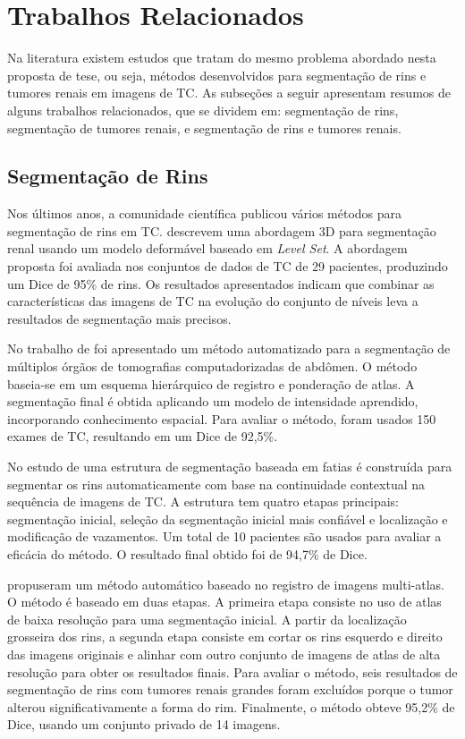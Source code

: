 \chapter{Trabalhos Relacionados}
\label{cap:trabalhos-relacionados}
\phantom{0}

Na literatura existem estudos que tratam do mesmo problema abordado nesta proposta de tese, ou seja, métodos desenvolvidos para segmentação de rins e tumores renais em imagens de TC. As subseções a seguir apresentam resumos de alguns trabalhos relacionados, que se dividem em: segmentação de rins, segmentação de tumores renais, e segmentação de rins e tumores renais.

\section{Segmentação de Rins}
\label{sec:trabalhos-relacionados-rins}

Nos últimos anos, a comunidade científica publicou vários métodos para segmentação de rins em TC.  descrevem uma abordagem 3D para segmentação renal usando um modelo deformável baseado em \textit{Level Set}. A abordagem proposta foi avaliada nos conjuntos de dados de TC de 29 pacientes, produzindo um Dice de 95\% de rins. Os resultados apresentados indicam que combinar as características das imagens de TC na evolução do conjunto de níveis leva a resultados de segmentação mais precisos.

No trabalho de  foi apresentado um método automatizado para a segmentação de múltiplos órgãos de tomografias computadorizadas de abdômen. O método baseia-se em um esquema hierárquico de registro e ponderação de atlas. A segmentação final é obtida aplicando um modelo de intensidade aprendido, incorporando conhecimento espacial. Para avaliar o método, foram usados 150 exames de TC, resultando em um Dice de 92,5\%.

No estudo de  uma estrutura de segmentação baseada em fatias é construída para segmentar os rins automaticamente com base na continuidade contextual na sequência de imagens de TC. A estrutura tem quatro etapas principais: segmentação inicial, seleção da segmentação inicial mais confiável e localização e modificação de vazamentos. Um total de 10 pacientes são usados para avaliar a eficácia do método. O resultado final obtido foi de 94,7\% de Dice.

 propuseram um método automático baseado no registro de imagens multi-atlas. O método é baseado em duas etapas. A primeira etapa consiste no uso de atlas de baixa resolução para uma segmentação inicial. A partir da localização grosseira dos rins, a segunda etapa consiste em cortar os rins esquerdo e direito das imagens originais e alinhar com outro conjunto de imagens de atlas de alta resolução para obter os resultados finais. Para avaliar o método, seis resultados de segmentação de rins com tumores renais grandes foram excluídos porque o tumor alterou significativamente a forma do rim. Finalmente, o método obteve 95,2\% de Dice, usando um conjunto privado de 14 imagens.

